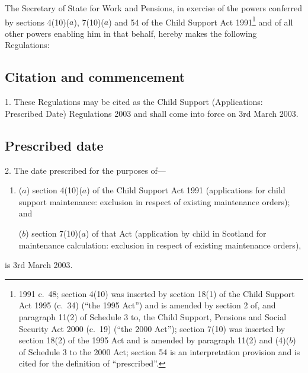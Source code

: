 \documentclass[12pt,a4paper]{article}
\title{\regstitle}
\author{S.I.\ 2003 No.\ 194}
\date{Made
4th February 2003\\
Laid before Parliament
7th February 2003\\
Coming into force
3rd March 2003
}
\begin{document}
\maketitle

\noindent
The Secretary of State for Work and Pensions, in exercise of the powers conferred by sections 4(10)($a$), 7(10)($a$)  and 54 of the Child Support Act 1991\footnote{1991 c.\ 48; section 4(10) was inserted by section 18(1) of the Child Support Act 1995 (c.\ 34) (“the 1995 Act”) and is amended by section 2 of, and paragraph 11(2) of Schedule 3 to, the Child Support, Pensions and Social Security Act 2000 (c.\ 19) (“the 2000 Act”); section 7(10) was inserted by section 18(2) of the 1995 Act and is amended by paragraph 11(2) and (4)($b$)  of Schedule 3 to the 2000 Act; section 54 is an interpretation provision and is cited for the definition of “prescribed”.} and of all other powers enabling him in that behalf, hereby makes the following Regulations: 

{\sloppy

\tableofcontents

}

\bigskip

\setcounter{secnumdepth}{-2}

\subsection[1. Citation and commencement]{Citation and commencement}

1.  These Regulations may be cited as the Child Support (Applications: Prescribed Date) Regulations 2003 and shall come into force on 3rd March 2003.

\subsection[2. Prescribed date]{Prescribed date}

2.  The date prescribed for the purposes of—
\begin{enumerate}\item[]
($a$) section 4(10)($a$)  of the Child Support Act 1991 (applications for child support maintenance: exclusion in respect of existing maintenance orders); and

($b$) section 7(10)($a$)  of that Act (application by child in Scotland for maintenance calculation: exclusion in respect of existing maintenance orders),
\end{enumerate}
is 3rd March 2003. 
\end{document}
